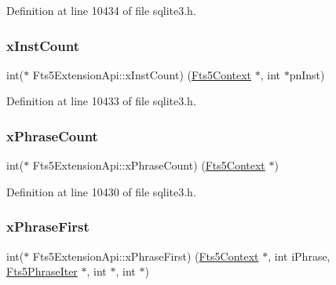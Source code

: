 Definition at line 10434 of file sqlite3.\+h.

\mbox{\label{struct_fts5_extension_api_af57aff7a8aa8402bb37a77892c4daf45}} 
\subsubsection{\texorpdfstring{x\+Inst\+Count}{xInstCount}}
{\footnotesize\ttfamily int($\ast$ Fts5\+Extension\+Api\+::x\+Inst\+Count) (\mbox{\hyperlink{sqlite3_8h_a97821b95ebebd43db901977ffd5b26bc}{Fts5\+Context}} $\ast$, int $\ast$pn\+Inst)}



Definition at line 10433 of file sqlite3.\+h.

\mbox{\label{struct_fts5_extension_api_a3ba0207080a9ca498625eefcc120bf1e}} 
\subsubsection{\texorpdfstring{x\+Phrase\+Count}{xPhraseCount}}
{\footnotesize\ttfamily int($\ast$ Fts5\+Extension\+Api\+::x\+Phrase\+Count) (\mbox{\hyperlink{sqlite3_8h_a97821b95ebebd43db901977ffd5b26bc}{Fts5\+Context}} $\ast$)}



Definition at line 10430 of file sqlite3.\+h.

\mbox{\label{struct_fts5_extension_api_ae2584a3afa2a70504847600e609d43ad}} 
\subsubsection{\texorpdfstring{x\+Phrase\+First}{xPhraseFirst}}
{\footnotesize\ttfamily int($\ast$ Fts5\+Extension\+Api\+::x\+Phrase\+First) (\mbox{\hyperlink{sqlite3_8h_a97821b95ebebd43db901977ffd5b26bc}{Fts5\+Context}} $\ast$, int i\+Phrase, \mbox{\hyperlink{struct_fts5_phrase_iter}{Fts5\+Phrase\+Iter}} $\ast$, int $\ast$, int $\ast$)}



